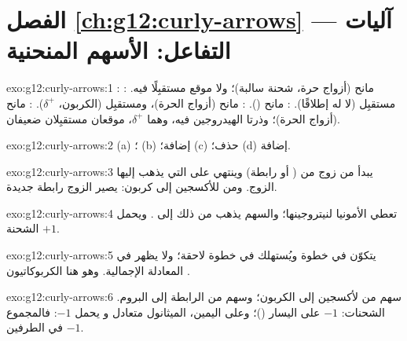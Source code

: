 \section*{الفصل \ref{ch:g12:curly-arrows} --- آليات التفاعل: الأسهم المنحنية}

\begin{solution}{exo:g12:curly-arrows:1}
: مانح (أزواج حرة، شحنة سالبة)؛ ولا موقع مستقبِلًا فيه.
: مستقبِل (لا  له إطلاقًا). : مانح (). : مانح (أزواج  الحرة)، ومستقبِل (الكربون،
$\delta^+$). : مانح (أزواج  الحرة)؛ وذرتا الهيدروجين فيه،
وهما $\delta^+$، موقعان مستقبِلان ضعيفان.
\end{solution}

\begin{solution}{exo:g12:curly-arrows:2}
(a) ؛ (b) إضافة؛ (c) حذف؛ (d) إضافة.
\end{solution}

\begin{solution}{exo:g12:curly-arrows:3}
يبدأ من زوج من  ( أو رابطة) وينتهي على
 التي يذهب إليها الزوج. ومن  للأكسجين إلى كربون: يصير
الزوج رابطة  جديدة.
\end{solution}

\begin{solution}{exo:g12:curly-arrows:4}
تعطي الأمونيا  لنيتروجينها؛ والسهم يذهب من ذلك
 إلى . ويحمل   الشحنة $+1$.
\end{solution}

\begin{solution}{exo:g12:curly-arrows:5}
 يتكوّن في خطوة ويُستهلك في خطوة لاحقة؛ ولا يظهر في
المعادلة الإجمالية. وهو هنا الكربوكاتيون .
\end{solution}

\begin{solution}{exo:g12:curly-arrows:6}
سهم من  لأكسجين  إلى الكربون؛ وسهم
من الرابطة  إلى البروم. الشحنات: $-1$ على اليسار
()؛ وعلى اليمين، الميثانول متعادل و يحمل $-1$:
فالمجموع $-1$ في الطرفين.
\end{solution}

